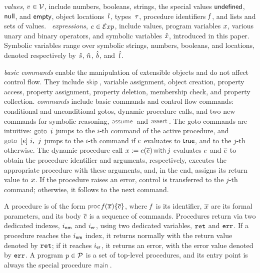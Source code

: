 \vspace{2pt}
\noindent \jsil \emph{values}, $v \in \mathcal{V}$, include numbers, booleans, strings, the special values ${\sf undefined}$, ${\sf null}$, and ${\sf empty}$, object locations~$l$, types~$\tau$, procedure identifiers $\mathit{f}$, and lists and sets of values.
\jsil~\emph{expressions}, $e \in \mathcal{E}xp$, include \jsil values, \jsil program variables $x$, various unary and binary operators, and symbolic variables $\hat{x}$, introduced in this paper. Symbolic variables range over symbolic strings, numbers, booleans, and locations, denoted respectively by $\hat{s}$, $\hat{n}$, $\hat{b}$, and~$\hat{l}$.

%

\jsil \emph{basic commands} enable the manipulation of extensible objects and do not affect control flow. 
They include $\jsilskip$, variable assignment, object creation, property access, property assignment, property deletion, membership check, and property collection.
%
\jsil \emph{commands} include \jsil basic commands and control flow commands: conditional and unconditional gotos, dynamic procedure calls, and two new commands for symbolic reasoning, $\assume$ and $\jassert$.  %
The goto commands are intuitive: $\goto \ i$ jumps to the $i$-th command of the active procedure, and $\ifgoto{\jsilexpr}{i}{j}$ jumps to the $i$-th command if $e$ evaluates to ${\sf true}$, and to the $j$-th otherwise. 
The dynamic procedure call $\jsilcall{\jvar}{\jsilexpr}{\jvec{\jsilexpr}}{j}$ evaluates  $e$ and $\overline{e}$ to obtain the procedure identifier and arguments, respectively, executes the appropriate procedure with these arguments, and, in the end, assigns its return value to $x$.
If the procedure raises an error, control is transferred to the $j$-th command; otherwise, it follows to the next command. 
%

A \jsil procedure is of the form $\procedure{\pid}{\jvec{\jvar}}{\jvec{\jcmd}}$, where $\mathit{f}$ is its identifier, $\overline{x}$ are its formal parameters, and its body ${\overline{c}}$  is a sequence of \jsil commands. 
Procedures return via two dedicated indexes, $i_{{\sf nm}}$ and $i_{{\sf er}}$, using two dedicated variables, $\mathtt{ret}$ and $\mathtt{err}$. If a procedure reaches the $i_{{\sf nm}}$ index, it returns normally with the return value denoted by $\mathtt{ret}$; if it reaches $i_{{\sf er}}$, it returns an error, with the error value denoted by $\mathtt{err}$.
%
A \jsil program $p \in \mathcal{P}$ is a set of top-level procedures, and its entry point is always the special procedure $\jsilmain$\hspace{-2pt}.


